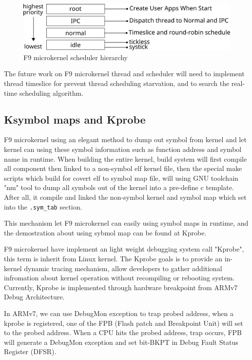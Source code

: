\documentclass[10pt,preprint,nocopyrightspace]{sigplanconf}
\begin{document}
\begin{figure}[H]
	\begin{center}
		\includegraphics[width=\linewidth]{picture/scheduler.png}
	\end{center}
	\caption{F9 microkernel scheduler hierarchy}
\end{figure}

The future work on F9 microkernel thread and scheduler will need to implement thread timeslice for prevent thread scheduling starvation, and to search the real-time scheduling algorithm. 


\subsection{Ksymbol maps and Kprobe}
F9 microkernel using an elegant method to dump out symbol from kernel and let kernel can using these symbol information such as function address and symbol name in runtime. When building the entire kernel, build system will first compile all component then linked to a non-symbol elf kernel file, then the special make scripts which build for covert elf to symbol map file, will using GNU toolchain "nm" tool to dump all symbols out of the kernel into a pre-define c template. After all, it compile and linked the non-symbol kernel and symbol map which set into the \texttt{.sym\_tab} section.

This mechanism let F9 microkernel can easily using symbol maps in runtime, and the demostration about using sybmol map can be found at Kprobe.

F9 microkernel have implement an light weight debugging system call "Kprobe", this term is inherit from Linux kernel. The Kprobe goals is to provide an in-kernel dynamic tracing mechanism, allow developers to gather additional infromation about kernel operation without recompiling or rebooting system. Currently, Kprobe is implemented through hardware breakpoint from ARMv7 Debug Architecture. 

In ARMv7, we can use DebugMon exception to trap probed address\cite{yiu2013definitive}, when a kprobe is registered, one of the FPB (Flash patch and Breakpoint Unit) will set to the probed address. When a CPU hits the probed address, trap occurs, FPB will generate a DebugMon exception and set bit-BKPT in Debug Fault Status Register (DFSR).
\end{document}
